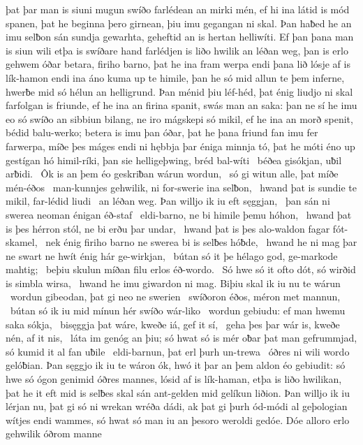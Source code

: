 þat þar man is siuni mugun swíðo farlédean
an mirki mén, ef hi ina látid is mód spanen,
þat he beginna þero girnean, þiu imu gegangan ni skal.
Þan haƀed he an imu selƀon sán sundja gewarhta,
geheftid an is hertan helliwíti.
Ef þan þana man is siun wili etþa is swíðare hand
farlédjen is liðo hwilik an léðan weg,
þan is erlo gehwem óðar betara,
firiho barno, þat he ina fram werpa
endi þana lið lósje af is lík-hamon
endi ina áno kuma up te himile,
þan he só mid allun te þem inferne,
hwerƀe mid só hélun an helligrund.
Þan ménid þiu léf-héd, þat énig liudjo ni skal
farfolgan is friunde, ef he ina an firina spanit,
swás man an saka: þan ne sí he imu eo só swíðo an sibbiun bilang,
ne iro mágskepi só mikil, ef he ina an morð spenit,
bédid balu-werko; betera is imu þan óðar,
þat he þana friund fan imu fer farwerpa,
míðe þes máges endi ni hębbja þar éniga minnja tó,
þat he móti éno up gestígan
hó himil-ríki, þan sie helligeþwing,
bréd bal-wíti \hld\ béðea gisókjan,
uƀil arƀidi. \hld\ Ôk is an þem éo geskriƀan
wárun wordun, \hld\ só gi witun alle,
þat míðe mén-éðos \hld\ man-kunnjes gehwilik,
ni for-swerie ina selƀon, \hld\ hwand þat is sundie te mikil,
far-lédid liudi \hld\ an léðan weg.
Þan willjo ik iu eft sęggjan, \hld\ þan sán ni swerea neoman
énigan éð-staf \hld\ eldi-barno,
ne bi himile þemu hóhon, \hld\ hwand þat is þes hérron stól,
ne bi erðu þar undar, \hld\ hwand þat is þes alo-waldon
fagar fót-skamel, \hld\ nek énig firiho barno
ne swerea bi is selƀes hóƀde, \hld\ hwand he ni mag þar ne swart ne hwít
énig hár ge-wirkjan, \hld\ bútan só it þe hélago god,
ge-markode mahtig; \hld\ beþiu skulun míðan filu
erlos éð-wordo. \hld\ Só hwe só it ofto dót,
só wirðid is simbla wirsa, \hld\ hwand he imu giwardon ni mag.
Biþiu skal ik iu nu te wárun \hld\ wordun gibeodan,
þat gi neo ne swerien \hld\ swíðoron éðos,
méron met mannun, \hld\ bútan só ik iu mid mínun hér
swíðo wár-liko \hld\ wordun gebiudu:
ef man hwemu saka sókja, \hld\ bisęggja þat wáre,
kweðe iá, gef it sí, \hld\ geha þes þar wár is,
kweðe nén, af it nis, \hld\ láta im genóg an þiu;
só hwat só is mér oƀar þat man gefrummjad,
só kumid it al fan uƀile \hld\ eldi-barnun,
þat erl þurh un-trewa \hld\ óðres ni wili
wordo gelóƀian. Þan sęggjo ik iu te wáron ók,
hwó it þar an þem aldon éo gebiudit:
só hwe só ógon genimid óðres mannes,
lósid af is lík-haman, etþa is liðo hwilikan,
þat he it eft mid is selƀes skal sán ant-gelden
mid gelíkun liðion. Þan willjo ik iu lérjan nu,
þat gi só ni wrekan wréða dádi,
ak þat gi þurh ód-módi al geþologian
wítjes endi wammes, só hwat só man iu an þesoro weroldi gedóe.
Dóe alloro erlo gehwilik óðrom manne
